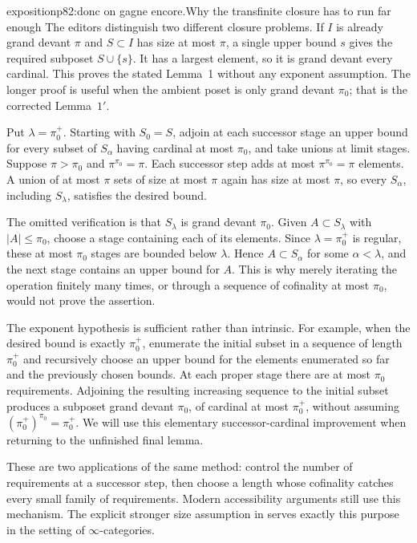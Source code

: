 \begin{dcomment}{exposition}{p82:donc on gagne encore.}{Why the transfinite closure has to run far enough}
The editors distinguish two different closure problems. If $I$ is already grand devant $\pi$ and $S\subset I$ has size at most $\pi$, a single upper bound $s$ gives the required subposet $S\cup\{s\}$. It has a largest element, so it is grand devant every cardinal. This proves the stated Lemma~1 without any exponent assumption. The longer proof is useful when the ambient poset is only grand devant $\pi_0$; that is the corrected Lemma~$1'$.

Put $\lambda=\pi_0^+$. Starting with $S_0=S$, adjoin at each successor stage an upper bound for every subset of $S_\alpha$ having cardinal at most $\pi_0$, and take unions at limit stages. Suppose $\pi>\pi_0$ and $\pi^{\pi_0}=\pi$. Each successor step adds at most $\pi^{\pi_0}=\pi$ elements. A union of at most $\pi$ sets of size at most $\pi$ again has size at most $\pi$, so every $S_\alpha$, including $S_\lambda$, satisfies the desired bound.

The omitted verification is that $S_\lambda$ is grand devant $\pi_0$. Given $A\subset S_\lambda$ with $|A|\leq\pi_0$, choose a stage containing each of its elements. Since $\lambda=\pi_0^+$ is regular, these at most $\pi_0$ stages are bounded below $\lambda$. Hence $A\subset S_\alpha$ for some $\alpha<\lambda$, and the next stage contains an upper bound for $A$. This is why merely iterating the operation finitely many times, or through a sequence of cofinality at most $\pi_0$, would not prove the assertion.

The exponent hypothesis is sufficient rather than intrinsic. For example, when the desired bound is exactly $\pi_0^+$, enumerate the initial subset in a sequence of length $\pi_0^+$ and recursively choose an upper bound for the elements enumerated so far and the previously chosen bounds. At each proper stage there are at most $\pi_0$ requirements. Adjoining the resulting increasing sequence to the initial subset produces a subposet grand devant $\pi_0$, of cardinal at most $\pi_0^+$, without assuming $(\pi_0^+)^{\pi_0}=\pi_0^+$. We will use this elementary successor-cardinal improvement when returning to the unfinished final lemma.

These are two applications of the same method: control the number of requirements at a successor step, then choose a length whose cofinality catches every small family of requirements. Modern accessibility arguments still use this mechanism. The explicit stronger size assumption in \citet[Lemma~5.4.2.8]{Lurie2009HTT} serves exactly this purpose in the setting of $\infty$-categories.
\end{dcomment}


